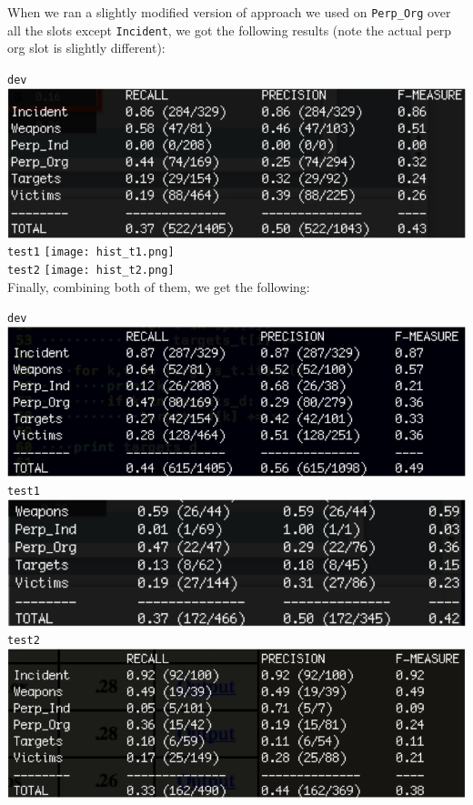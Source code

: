 \documentclass[11pt]{myclass}
\begin{document}
When we ran a slightly modified version of approach we used on \texttt{Perp\_Org} over all the slots except \texttt{Incident}, we got the following results (note the actual perp org slot is slightly different):

\texttt{dev}
\includegraphics[scale=0.75]{hist_dev.png} \\

\texttt{test1}
\texttt{[image: hist\_t1.png]} \\

\texttt{test2}
\texttt{[image: hist\_t2.png]} \\


Finally, combining both of them, we get the following:

\texttt{dev}
\includegraphics[scale=0.75]{amphist_dev.png} \\

\texttt{test1}
\includegraphics[scale=0.75]{amphist_t1.png} \\

\texttt{test2}
\includegraphics[scale=0.75]{amphist_t2.png} \\
\end{document}

